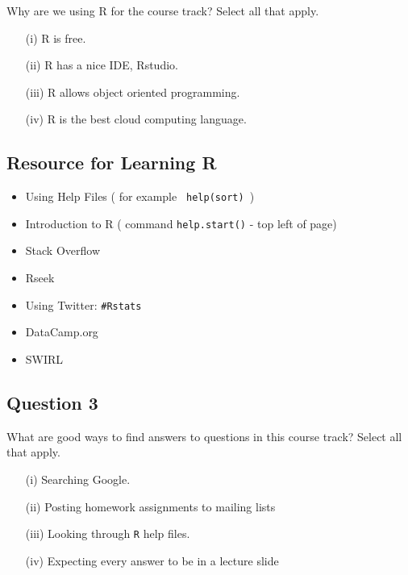 \documentclass[12pt]{article}
\begin{document}
 
Why are we using R for the course track? Select all that apply. 


\begin{itemize}

\item[(i)] R is free. 

\item[(ii)] R has a nice IDE, Rstudio. 

\item[(iii)] R allows object oriented programming. 

\item[(iv)] R is the best cloud computing language. 

\end{itemize}
\newpage
\subsection*{Resource for Learning R}


\begin{itemize}
\item  Using Help Files ( for example \texttt{ help(sort) })
\item Introduction to R ( command \texttt{help.start()} - top left of page)
\item Stack Overflow
\item Rseek
\item Using Twitter: \texttt{\#Rstats}
\item DataCamp.org
\item SWIRL
\end{itemize}

\newpage
\subsection*{Question 3}
 
What are good ways to find answers to questions in this course track? Select all that apply. 




\begin{itemize}

\item[(i)] Searching Google. 

\item[(ii)]  Posting homework assignments to mailing lists 

\item[(iii)] Looking through \texttt{R} help files. 

\item[(iv)] Expecting every answer to be in a lecture slide 
\end{itemize}
\end{document}
